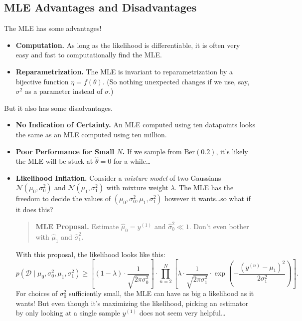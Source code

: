 \subsection{MLE Advantages and Disadvantages}

The MLE has some advantages!
\begin{itemize}
    \item \textbf{Computation.}
    As long as the likelihood is differentiable,
    it is often very easy and fast to computationally find the MLE.
    \item \textbf{Reparametrization.}
    The MLE is invariant to reparametrization
    by a bijective function $\eta = f(\theta)$.
    (So nothing unexpected changes if we use, say,
    $\sigma^2$ as a parameter instead of $\sigma$.)
\end{itemize}

But it also has some disadvantages.
\begin{itemize}
    \item \textbf{No Indication of Certainty.}
    An MLE computed using ten datapoints
    looks the same as an MLE computed using ten million.
    \item \textbf{Poor Performance for Small $N$.}
    If we sample from $\mathrm{Ber}(0.2)$,
    it's likely the MLE will be stuck at $\hat{\theta} = 0$ for a while\dots
    \item \textbf{Likelihood Inflation.}
    Consider a \emph{mixture model} of two Gaussians
    $\mathcal{N}(\mu_0, \sigma_0^2)$ and $\mathcal{N}(\mu_1, \sigma_1^2)$
    with mixture weight $\lambda$.
    The MLE has the freedom to decide the values of $(\mu_0, \sigma_0^2, \mu_1, \sigma_1^2)$
    however it wants\dots so what if it does this?
    \begin{quote}
        \textbf{MLE Proposal.} Estimate $\hat{\mu}_0 = y^{(1)}$ and $\hat{\sigma}_0^2 \ll 1$.
        Don't even bother with $\hat{\mu}_1$ and $\hat{\sigma}_1^2$.
    \end{quote}
    With this proposal, the likelihood looks like this:
    \[ p(\mathcal{D} \mid \mu_0, \sigma_0^2, \mu_1, \sigma_1^2)
    \geq \left[(1 - \lambda) \cdot \frac{1}{\sqrt{2\pi \sigma_0^2}}\right]
    \cdot \prod_{n = 2}^N \left[
        \lambda \cdot \frac{1}{\sqrt{2\pi \sigma_1^2}} \cdot
        \exp\left(-\frac{(y^{(n)} - \mu_1)^2}{2\sigma_1^2}\right)
    \right]. \]
    For choices of $\sigma_0^2$ sufficiently small,
    the MLE can have as big a likelihood as it wants!
    But even though it's maximizing the likelihood,
    picking an estimator by only looking at a single sample $y^{(1)}$
    does not seem very helpful\dots
\end{itemize}

